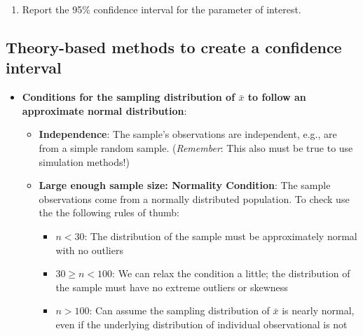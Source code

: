 \documentclass[
]{report}
\newenvironment{Shaded}{\begin{snugshade}}{\end{snugshade}}
\newcommand{\AttributeTok}[1]{\textcolor[rgb]{0.13,0.29,0.53}{#1}}
\newcommand{\CommentTok}[1]{\textcolor[rgb]{0.56,0.35,0.01}{\textit{#1}}}
\newcommand{\DecValTok}[1]{\textcolor[rgb]{0.00,0.00,0.81}{#1}}
\newcommand{\FunctionTok}[1]{\textcolor[rgb]{0.13,0.29,0.53}{\textbf{#1}}}
\newcommand{\NormalTok}[1]{#1}
\newcommand{\SpecialCharTok}[1]{\textcolor[rgb]{0.81,0.36,0.00}{\textbf{#1}}}
\newcommand{\StringTok}[1]{\textcolor[rgb]{0.31,0.60,0.02}{#1}}
\providecommand{\tightlist}{%
  \setlength{\itemsep}{0pt}\setlength{\parskip}{0pt}}
\begin{document}
\begin{Shaded}
\end{Shaded}

\begin{enumerate}
\def\labelenumi{\arabic{enumi}.}
\setcounter{enumi}{2}
\tightlist
\item
  Report the 95\% confidence interval for the parameter of interest.
\end{enumerate}

\vspace{0.2in}

\subsection*{Theory-based methods to create a confidence interval}\label{theory-based-methods-to-create-a-confidence-interval}

\begin{itemize}
\item
  \textbf{Conditions for the sampling distribution of \(\bar{x}\) to follow an approximate normal distribution}:

  \begin{itemize}
  \item
    \textbf{Independence}: The sample's observations are independent, e.g., are from a simple random sample. (\emph{Remember}: This also must be true to use simulation methods!)
  \item
    \textbf{Large enough sample size: Normality Condition}: The sample observations come from a normally distributed population. To check use the the following rules of thumb:

    \begin{itemize}
    \item
      \(n < 30\): The distribution of the sample must be approximately normal with no outliers
    \item
      \(30 \ge n < 100\): We can relax the condition a little; the distribution of the sample must have no extreme outliers or skewness
    \item
      \(n > 100\): Can assume the sampling distribution of \(\bar{x}\) is nearly normal, even if the underlying distribution of individual observational is not
    \end{itemize}
  \end{itemize}
\end{itemize}
\end{document}
